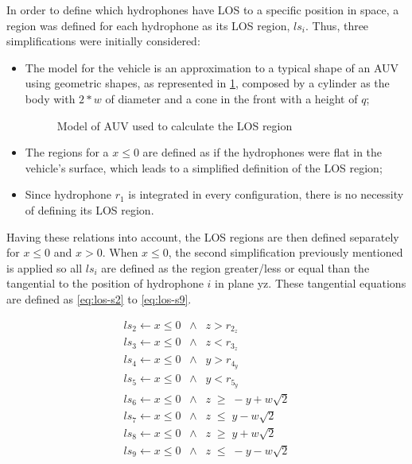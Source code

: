 In order to define which hydrophones have LOS to a specific position in space, a region was defined for each hydrophone as its LOS region, $ls_i$. Thus, three simplifications were initially considered: 
\begin{itemize}
	\item The model for the vehicle is an approximation to a typical shape of an AUV using geometric shapes, as represented in \ref{fig:auv-geo}, composed by a cylinder as the body with $2*w$ of diameter and a cone in the front with a height of $q$;
	
	\begin{figure}[!htbp]
		\captionsetup{justification=centering,margin=2cm}
		\caption{Model of AUV used to calculate the LOS region}
		\label{fig:auv-geo}
	\end{figure}
	
	\item The regions for a $x \leq 0$ are defined as if the hydrophones were flat in the vehicle's surface, which leads to a simplified definition of the LOS region;
	
	\item Since hydrophone $r_1$ is integrated in every configuration, there is no necessity of defining its LOS region.

\end{itemize}

Having these relations into account, the LOS regions are then defined separately for $x \leq 0$ and $x > 0$. When $x \leq 0$, the second simplification previously mentioned is applied so all $ls_i$ are defined as the region greater/less or equal than the tangential to the position of hydrophone $i$ in plane yz. These tangential equations are defined as \ref{eq:los-s2} to \ref{eq:los-s9}.

\begin{eqnarray}
ls_2 \gets x \leq 0 \; \;  \wedge  \; \; z > r_{2_z} \\
\label{eq:los-s2}
ls_3 \gets x \leq 0 \; \;  \wedge  \; \; z < r_{3_z} \\
\label{eq:los-s3}
ls_4\gets x \leq 0 \; \;  \wedge  \; \; y > r_{4_y}  \\
\label{eq:los-s4}
ls_5\gets 	x \leq 0 \; \;  \wedge  \; \; y < r_{5_y} \\
\label{eq:los-s5}
ls_6 \gets	x \leq 0 \; \; \wedge  \; \; z \; \geq \; - y + w \sqrt{2} \\
\label{eq:los-s6}
ls_7 \gets	x \leq 0 \; \; \wedge  \; \; z \; \leq \; y - w \sqrt{2} \\
\label{eq:los-s7}
ls_8 \gets x \leq 0 \; \; \wedge  \; \;  z \; \geq \; y + w \sqrt{2} \\
\label{eq:los-s8}
ls_9 \gets 	x \leq 0 \; \; \wedge  \; \;  z \; \leq \; - y - w \sqrt{2}
\label{eq:los-s9}
\end{eqnarray}

